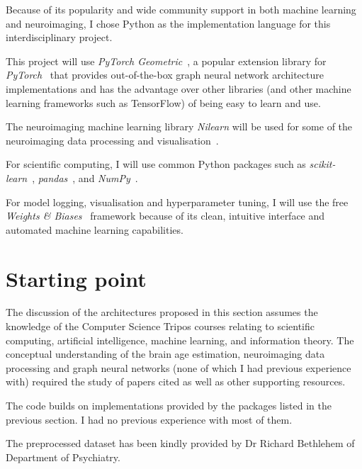 Because of its popularity and wide community support in both machine learning and neuroimaging, I chose Python as the implementation language for this interdisciplinary project.

This project will use \textit{PyTorch Geometric}~\cite{fey2019pytorch}, a popular extension library for \textit{PyTorch}~\cite{pytorch} that provides out-of-the-box graph neural network architecture implementations and has the advantage over other libraries (and other machine learning frameworks such as TensorFlow) of being easy to learn and use. 

The neuroimaging machine learning library \textit{Nilearn} will be used for some of the neuroimaging data processing and visualisation~\cite{abraham2014machine, nilearn}.

For scientific computing, I will use common Python packages such as \textit{scikit-learn}~\cite{pedregosa2011scikit}, \textit{pandas}~\cite{mckinney2010scipy}, and \textit{NumPy}~\cite{walt2011numpy}. 

For model logging, visualisation and hyperparameter tuning, I will use the free \textit{Weights \& Biases}~\cite{wandb} framework because of its clean, intuitive interface and automated machine learning capabilities.


\section{Starting point}
The discussion of the architectures proposed in this section assumes the knowledge of the Computer Science Tripos courses relating to scientific computing, artificial intelligence, machine learning, and information theory. The conceptual understanding of the brain age estimation, neuroimaging data processing and graph neural networks (none of which I had previous experience with) required the study of papers cited as well as other supporting resources.

The code builds on implementations provided by the packages listed in the previous section. I had no previous experience with most of them.

The preprocessed dataset has been kindly provided by Dr Richard Bethlehem of Department of Psychiatry.